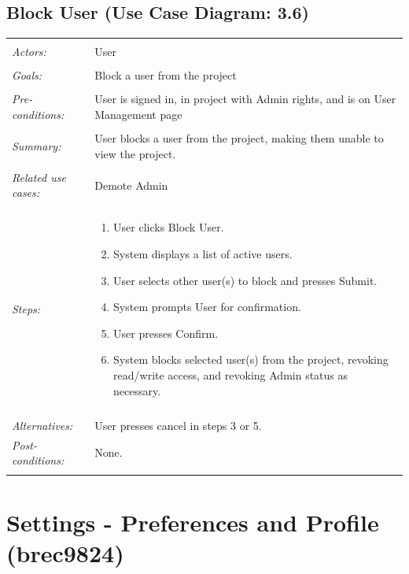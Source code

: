 \documentclass[11pt]{report}
\begin{document}
\subsection{Block User (Use Case Diagram: 3.6)}
\begin{tabular}{ p{2cm} p{12cm} }
    \hline
    \\
    \textit{Actors:} & User \\ 
    \\
    \textit{Goals:} & Block a user from the project \\
    \\
    \textit{Pre-conditions:} & User is signed in, in project with Admin rights, and is on User Management page \\
    \\
    \textit{Summary:} & User blocks a user from the project, making them unable to view the project. \\ 
    \\
    \textit{Related use cases:} & Demote Admin \\ 
    \\
    \textit{Steps:} & \begin{enumerate}
        \item User clicks Block User.
        \item System displays a list of active users.
        \item User selects other user(s) to block and presses Submit.
        \item System prompts User for confirmation.
        \item User presses Confirm.
        \item System blocks selected user(s) from the project, revoking read/write access, and revoking Admin status as necessary.
    \end{enumerate} \\
    \\
    \textit{Alternatives:} & User presses cancel in steps 3 or 5.
    \\
    \textit{Post-conditions:} & None. \\
    \\
    \hline
\end{tabular}


\section{Settings - Preferences and Profile (brec9824)}
\end{document}
